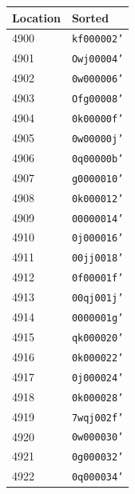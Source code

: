 \begin{table}[h!]
\begin{minipage}{0.48\textwidth}
\centering
\begin{tabular}{ll}
\toprule
\textbf{Location} & \textbf{Sorted} \\
\midrule
4900 & \texttt{kf000002'} \\
4901 & \texttt{Owj00004'} \\
4902 & \texttt{0w000006'} \\
4903 & \texttt{Ofg00008'} \\
4904 & \texttt{0k00000f'} \\
4905 & \texttt{0w00000j'} \\
4906 & \texttt{0q00000b'} \\
4907 & \texttt{g0000010'} \\
4908 & \texttt{0k000012'} \\
4909 & \texttt{00000014'} \\
4910 & \texttt{0j000016'} \\
4911 & \texttt{00jj0018'} \\
4912 & \texttt{0f00001f'} \\
4913 & \texttt{00qj001j'} \\
4914 & \texttt{0000001g'} \\
4915 & \texttt{qk000020'} \\
4916 & \texttt{0k000022'} \\
4917 & \texttt{0j000024'} \\
4918 & \texttt{0k000028'} \\
4919 & \texttt{7wqj002f'} \\
4920 & \texttt{0w000030'} \\
4921 & \texttt{0g000032'} \\
4922 & \texttt{0q000034'} \\
\bottomrule
\end{tabular}
\end{minipage}
\end{table}

